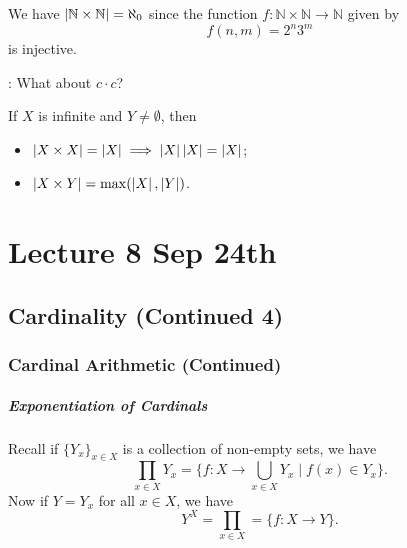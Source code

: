 \documentclass[notoc,notitlepage]{tufte-book}
\begin{document}
\begin{eg}
  We have $\left|\mathbb{N} \times \mathbb{N}\right| = \aleph_0$ since the function $f : \mathbb{N} \times \mathbb{N} \to \mathbb{N}$ given by
  \begin{equation*}
    f(n, m) = 2^n 3^m
  \end{equation*}
  is injective.
\end{eg}

: What about $c \cdot c$?

\begin{thm}\label{thm:multiplication_of_cardinals}
  If $X$ is infinite and $Y \neq \emptyset$, then
  \begin{itemize}
    \item $\left|X \times X\right| = \left|X\right| \implies \left|X\right| \left|X\right| = \left|X\right|$;
    \item $\left|X \times Y\right| = \max(\left|X\right|, \left|Y\right|)$.
  \end{itemize}
\end{thm}




\chapter{Lecture 8 Sep 24th}%
\label{chp:lecture_8_sep_24th}

\section{Cardinality (Continued 4)}%
\label{sec:cardinality_continued_4}

\subsection{Cardinal Arithmetic (Continued)}%
\label{sub:cardinal_arithmetic_continued}

\paragraph{Exponentiation of Cardinals} Recall if $\{Y_x\}_{x \in X}$ is a collection of non-empty sets, we have
\begin{equation*}
  \prod_{x \in X} Y_x = \{ f : X \to \bigcup_{x \in X} Y_x \mid f(x) \in Y_x \}.
\end{equation*}
Now if $Y = Y_x$ for all $x \in X$, we have
\begin{equation*}
  Y^X = \prod_{x \in X} = \{ f : X \to Y \}.
\end{equation*}
\end{document}
